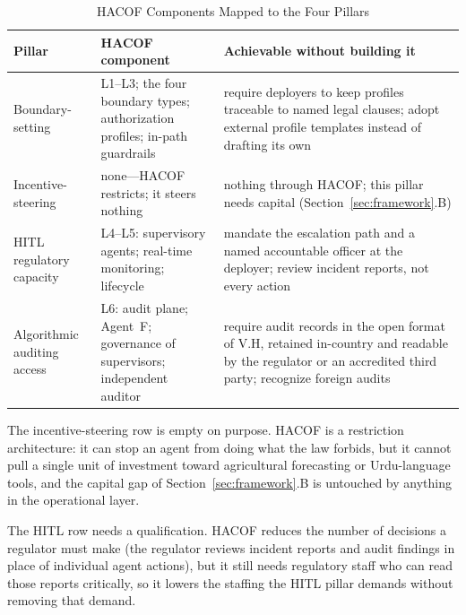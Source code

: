 \documentclass[journal]{IEEEtran}
\newcommand{\hacof}{HACOF}
\begin{document}
\begin{table}[!t]
\caption{\hacof{} Components Mapped to the Four Pillars}
\label{tab:hacofmap}
\centering
\footnotesize
\setlength{\tabcolsep}{3pt}
\begin{tabular}{>{\raggedright\arraybackslash}p{1.6cm}>{\raggedright\arraybackslash}p{2.35cm}>{\raggedright\arraybackslash}p{3.2cm}}
\toprule
\rowcolor{darkblue!15}
\textbf{Pillar} & \textbf{\hacof{} component} & \textbf{Achievable without building it} \\
\midrule
\rowcolor{steelblue!8}
Boundary-setting & L1--L3; the four boundary types; authorization profiles; in-path guardrails & require deployers to keep profiles traceable to named legal clauses; adopt external profile templates instead of drafting its own \\
\rowcolor{tealcolor!8}
Incentive-steering & none---\hacof{} restricts; it steers nothing & nothing through \hacof; this pillar needs capital (Section~\ref{sec:framework}.B) \\
\rowcolor{ambercolor!8}
HITL regulatory capacity & L4--L5: supervisory agents; real-time monitoring; lifecycle & mandate the escalation path and a named accountable officer at the deployer; review incident reports, not every action \\
\rowcolor{slateblue!8}
Algorithmic auditing access & L6: audit plane; Agent~F; governance of supervisors; independent auditor & require audit records in the open format of V.H, retained in-country and readable by the regulator or an accredited third party; recognize foreign audits \\
\bottomrule
\end{tabular}
\end{table}

The incentive-steering row is empty on purpose. \hacof{} is a restriction architecture: it can stop an agent from doing what the law forbids, but it cannot pull a single unit of investment toward agricultural forecasting or Urdu-language tools, and the capital gap of Section~\ref{sec:framework}.B is untouched by anything in the operational layer.

The HITL row needs a qualification. \hacof{} reduces the number of decisions a regulator must make (the regulator reviews incident reports and audit findings in place of individual agent actions), but it still needs regulatory staff who can read those reports critically, so it lowers the staffing the HITL pillar demands without removing that demand.
\end{document}
